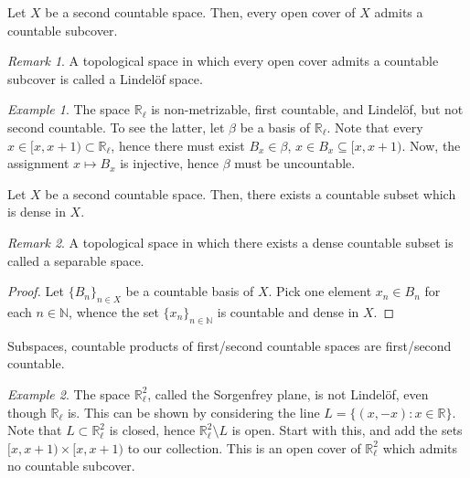 \documentclass[11pt]{article}
\newcommand{\R}{\mathbb{R}}
\newcommand{\N}{\mathbb{N}}
\theoremstyle{definition}
\theoremstyle{remark}
\newtheorem*{remark}{Remark}
\newtheorem*{example}{Example}
\numberwithin{equation}{section}
\begin{document}
    \begin{lemma}
        Let $X$ be a second countable space. Then, every open cover of $X$ admits a
        countable subcover.
        \begin{remark}
            A topological space in which every open cover admits a countable subcover
            is called a Lindel\"of space.
        \end{remark}
    \end{lemma}

    \begin{example}
        The space $\R_\ell$ is non-metrizable, first countable, and Lindel\"of, but
        not second countable. To see the latter, let $\beta$ be a basis of $\R_\ell$.
        Note that every $x \in [x, x + 1) \subset \R_\ell$, hence there must exist
        $B_x \in \beta$, $x \in B_x \subseteq [x, x + 1)$. Now, the assignment $x
        \mapsto B_x$ is injective, hence $\beta$ must be uncountable.
    \end{example}
    
    \begin{lemma}
        Let $X$ be a second countable space. Then, there exists a countable subset
        which is dense in $X$.
        \begin{remark}
            A topological space in which there exists a dense countable subset is
            called a separable space.
        \end{remark}
    \end{lemma}
    \begin{proof}
        Let $\{B_n\}_{n \in X}$ be a countable basis of $X$. Pick one element $x_n
        \in B_n$ for each $n \in \N$, whence the set $\{x_n\}_{n \in \N}$ is
        countable and dense in $X$.
    \end{proof}


    \begin{lemma}
        Subspaces, countable products of first/second countable spaces are
        first/second countable.
    \end{lemma}

    \begin{example}
        The space $\R_\ell^2$, called the Sorgenfrey plane, is not Lindel\"of, even
        though $\R_\ell$ is. This can be shown by considering the line $L = \{(x,
        -x): x \in \R\}$. Note that $L \subset \R_\ell^2$ is closed, hence $\R_\ell^2
        \setminus L$ is open. Start with this, and add the sets $[x, x + 1)\times [x,
        x + 1)$ to our collection. This is an open cover of $\R_\ell^2$ which admits
        no countable subcover.
    \end{example}
\end{document}
